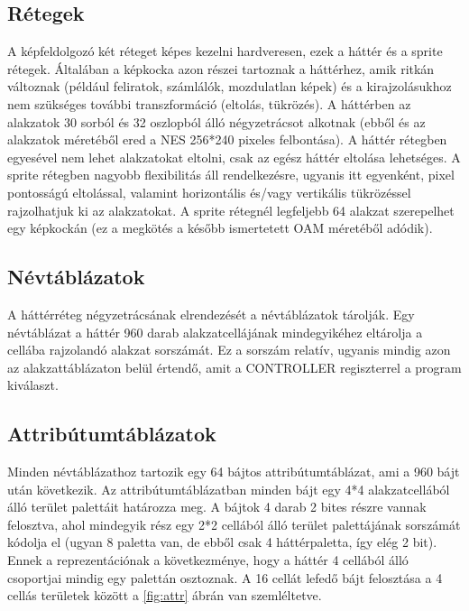 \subsection{Rétegek \cite{ppuref}}
A képfeldolgozó két réteget képes kezelni hardveresen, ezek a háttér és a sprite rétegek.
Általában a képkocka azon részei tartoznak a háttérhez, amik ritkán változnak (például feliratok, számlálók, mozdulatlan képek) és a kirajzolásukhoz nem szükséges további transzformáció (eltolás, tükrözés). A háttérben az alakzatok 30 sorból és 32 oszlopból álló négyzetrácsot alkotnak (ebből és az alakzatok méretéből ered a NES 256*240 pixeles felbontása).
A háttér rétegben egyesével nem lehet alakzatokat eltolni, csak az egész háttér eltolása lehetséges. A sprite rétegben nagyobb flexibilitás áll rendelkezésre, ugyanis itt egyenként, pixel pontosságú eltolással, valamint horizontális és/vagy vertikális tükrözéssel rajzolhatjuk ki az alakzatokat. A sprite rétegnél legfeljebb 64 alakzat szerepelhet egy képkockán (ez a megkötés a később ismertetett OAM méretéből adódik).  

\subsection{Névtáblázatok \cite{ppuref}}

A háttérréteg négyzetrácsának elrendezését a névtáblázatok tárolják. Egy névtáblázat a háttér 960 darab alakzatcellájának mindegyikéhez eltárolja a cellába rajzolandó alakzat sorszámát. Ez a sorszám relatív, ugyanis mindig azon az alakzattáblázaton belül értendő, amit a CONTROLLER regiszterrel a program kiválaszt.

\subsection{Attribútumtáblázatok \cite{ppuref}}

Minden névtáblázathoz tartozik egy 64 bájtos attribútumtáblázat, ami a 960 bájt után következik. Az attribútumtáblázatban minden bájt egy 4*4 alakzatcellából álló terület palettáit határozza meg. A bájtok 4 darab 2 bites részre vannak felosztva, ahol mindegyik rész egy 2*2 cellából álló terület palettájának sorszámát kódolja el (ugyan 8 paletta van, de ebből csak 4 háttérpaletta, így elég 2 bit). Ennek a reprezentációnak a következménye, hogy a háttér 4 cellából álló csoportjai mindig egy palettán osztoznak. A 16 cellát lefedő bájt felosztása a 4 cellás területek között a \ref{fig:attr} ábrán van szemléltetve.

